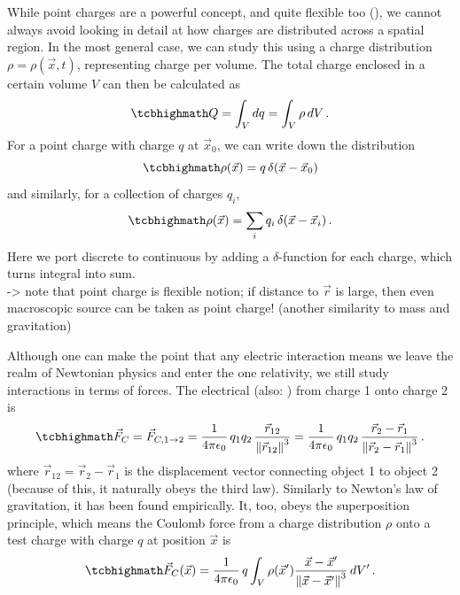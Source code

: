 \documentclass[../class_mech_main.tex]{subfiles}
\DeclareMathOperator{\fpeps}{\frac{1}{4 \pi \epsilon_0}}
\begin{document}
While point charges are a powerful concept, and quite flexible too (), we cannot always avoid looking in detail at how charges are distributed across a spatial region. In the most general case, we can study this using a charge distribution $\rho = \rho(\vec{x}, t)$, representing charge per volume. The total charge enclosed in a certain volume $V$ can then be calculated as
\begin{equation}
    \eqbox{
        Q = \int_V dq = \int_V \rho \, dV
    } \, .
\end{equation}
For a point charge with charge $q$ at $\vec{x}_0$, we can write down the distribution
\begin{equation}
    \eqbox{
        \rho(\vec{x}) = q \, \delta(\vec{x} - \vec{x}_0)
    }
\end{equation}
and similarly, for a collection of charges $q_i$,
\begin{equation}
    \eqbox{
        \rho(\vec{x}) = \sum_i q_i \, \delta(\vec{x} - \vec{x}_i)
    } \, .
\end{equation}
Here we port discrete to continuous by adding a $\delta$-function for each charge, which turns integral into sum.\\


-> note that point charge is flexible notion; if distance to $\vec{r}$ is large, then even macroscopic source can be taken as point charge! (another similarity to mass and gravitation)



Although one can make the point that any electric interaction means we leave the realm of Newtonian physics and enter the one relativity, we still study interactions in terms of forces. The electrical  (also: ) from charge 1 onto charge 2 is
\begin{equation}
    \eqbox{
        \vec{F}_C = \vec{F}_{C, 1 \rightarrow 2}
        = \fpeps q_1 q_2 \, \frac{\vec{r}_{12}}{\norm{\vec{r}_{12}}^3}
        = \fpeps q_1 q_2 \, \frac{\vec{r}_2 - \vec{r}_1}{\norm{\vec{r}_2 - \vec{r}_1}^3}
    } \, .
\end{equation}
where $\vec{r}_{12} = \vec{r}_2 - \vec{r}_1$ is the displacement vector connecting object 1 to object 2 (because of this, it naturally obeys the third law). Similarly to Newton's law of gravitation, it has been found empirically. It, too, obeys the superposition principle, which means the Coulomb force from a charge distribution $\rho$ onto a test charge with charge $q$ at position $\vec{x}$ is
\begin{equation}
    \eqbox{
        \vec{F}_C(\vec{x}) = \fpeps q \int_V \rho(\vec{x}') \frac{\vec{x} - \vec{x}'}{\norm{\vec{x} - \vec{x}'}^3} \, dV'
    } \, .
\end{equation}
\end{document}
